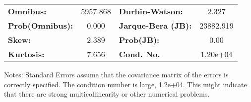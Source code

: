 \begin{center}
\begin{tabular}{lcccccc}
\bottomrule
\end{tabular}
\begin{tabular}{lclc}
\textbf{Omnibus:}       & 5957.868 & \textbf{  Durbin-Watson:     } &     2.327  \\
\textbf{Prob(Omnibus):} &   0.000  & \textbf{  Jarque-Bera (JB):  } & 23882.919  \\
\textbf{Skew:}          &   2.389  & \textbf{  Prob(JB):          } &      0.00  \\
\textbf{Kurtosis:}      &   7.656  & \textbf{  Cond. No.          } &  1.20e+04  \\
\bottomrule
\end{tabular}
\end{center}

Notes: \newline
 [1] Standard Errors assume that the covariance matrix of the errors is correctly specified. \newline
 [2] The condition number is large, 1.2e+04. This might indicate that there are \newline
 strong multicollinearity or other numerical problems.